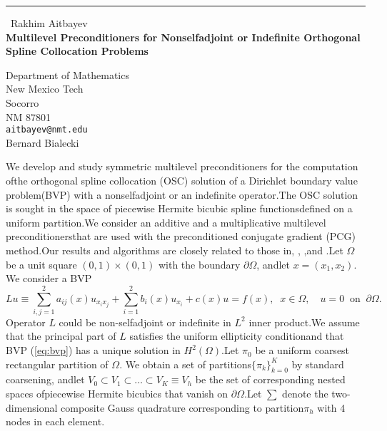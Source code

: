 \documentclass{report}
\begin{document}
\begin{center}
\rule{6in}{1pt} \
{\large Rakhim Aitbayev \\
{\bf Multilevel Preconditioners for Nonselfadjoint or Indefinite Orthogonal Spline Collocation Problems}}

Department of Mathematics \\ New Mexico Tech \\ Socorro \\ NM 87801
\\
{\tt aitbayev@nmt.edu}\\
Bernard Bialecki\end{center}

\newtheorem*{theorem}{Theorem}\newcommand{\GP}{\mbox{${\cal G}$}}\newcommand{\SH}{\mbox{$\scriptscriptstyle H^{2}(\Omega)$}}\newcommand{\SL}{\mbox{$\scriptscriptstyle L^{2}(\Omega)$}}We develop and study symmetric multilevel preconditioners for the computation ofthe orthogonal spline collocation (OSC) solution of a Dirichlet boundary value problem(BVP) with a nonselfadjoint or an indefinite operator.The OSC solution is sought in the space of piecewise Hermite bicubic spline functionsdefined on a uniform partition.We consider an additive and a multiplicative multilevel preconditionersthat are used with the preconditioned conjugate gradient (PCG) method.Our results and algorithms are closely related to those in\cite{Aitbayev_Bialecki_2003},
\cite{Bialecki_1998},
\cite{Bialecki_Dryja_1997},and \cite{SBG_1996}.Let $\Omega$ be a unit square $(0,1)\times(0,1)$ with the boundary $\partial\Omega$,
andlet $x=(x_1,x_2)$.
We consider a BVP\begin{equation}\label{eq:bvp}Lu\equiv\sum_{i,j=1}^{2} a_{ij}(x)u_{x_ix_j}+\sum_{i=1}^{2} b_i(x) u_{x_i}+c(x)u = f(x),\;\;x\in\Omega,\quad u=0 \;\;\mbox{on}\;\;\partial\Omega.\end{equation}Operator $L$ could be non-selfadjoint or indefinite in $L^2$ inner product.We assume that the principal part of $L$ satisfies the uniform ellipticity conditionand that BVP (\ref{eq:bvp}) has a unique solution in $H^2(\Omega)$.Let $\pi_0$ be a uniform coarsest rectangular partition of $\Omega$.
We obtain a set of partitions$\{\pi_k\}_{k=0}^{K}$ by standard coarsening,
andlet $V_0\subset V_1\subset\ldots\subset V_K\equiv V_h$ be the set of corresponding nested spaces ofpiecewise Hermite bicubics that vanish on $\partial\Omega$.Let $\sum$ denote the two-dimensional composite Gauss quadrature corresponding to partition$\pi_h$ with 4 nodes in each element.
\end{document}

